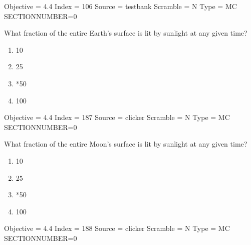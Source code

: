 \documentclass[11pt]{article}
\begin{document}
\begin{enumerate}
\begin{minipage}{\textwidth}
\begin{minipage}{\textwidth}
Objective = 4.4
Index = 106
Source = testbank
Scramble = N
Type = MC
SECTIONNUMBER=0
\end{minipage}
\end{minipage}
\vskip 0.20in

\begin{minipage}{\textwidth}
\begin{minipage}{\textwidth}
\item What fraction of the entire Earth’s surface is lit by sunlight at any given time?
\begin{multicols}{3}
\begin{enumerate} 
\setlength{\itemsep}{1pt} 
\setlength{\parskip}{0pt} 
\setlength{\parsep}{0pt}
\setlength{\multicolsep}{1pt} 
\item 10%
\item 25%
\item *50%
\item 100%
\end{enumerate} 
\vfill 
\end{multicols}

Objective = 4.4
Index = 187
Source = clicker
Scramble = N
Type = MC
SECTIONNUMBER=0
\end{minipage}
\end{minipage}
\vskip 0.20in

\begin{minipage}{\textwidth}
\begin{minipage}{\textwidth}
\item What fraction of the entire Moon’s surface is lit by sunlight at any given time?
\begin{multicols}{3}
\begin{enumerate} 
\setlength{\itemsep}{1pt} 
\setlength{\parskip}{0pt} 
\setlength{\parsep}{0pt}
\setlength{\multicolsep}{1pt} 
\item 10%
\item 25%
\item *50%
\item 100%
\end{enumerate} 
\vfill 
\end{multicols}

Objective = 4.4
Index = 188
Source = clicker
Scramble = N
Type = MC
SECTIONNUMBER=0
\end{minipage}
\end{minipage}
\vskip 0.20in


\end{enumerate}
\end{document}
